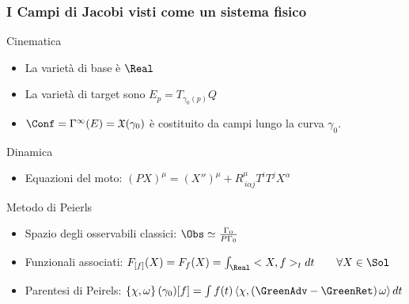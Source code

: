 \documentclass[8pt,handout]{beamer}
\begin{document}
	\begin{frame}
		\frametitle{I Campi di Jacobi visti come un sistema fisico}
			\begin{block}{Cinematica}
					\begin{itemize}
						\item La varietà di base è $\Real$ 
				\item La varietà di target  sono $E_p = T_{\gamma_0(p)}Q$
				\item $\Conf = \Gamma^\infty(E) = \mathfrak{X}(\gamma_0)$ è costituito da campi lungo la curva $\gamma_0$.
					\end{itemize}
			\end{block}
			\begin{block}{Dinamica}

				\begin{itemize}
					\item Equazioni del moto: $ \left( P X \right)^\mu = (X'')^\mu + R^\mu_{\, i \alpha j } T^i T^j X^\alpha$ 
				\end{itemize}

			\end{block}
	

			\begin{block}{Metodo di Peierls}
				\begin{itemize}
					\item Spazio degli osservabili classici:  $	\Obs \simeq \frac{\Gamma_0}{P \Gamma_0}$
					\item Funzionali associati: $ F_{[f]}(X) = F_f (X)= \int_\Real <X, f>_t dt \qquad \forall X \in \Sol $
					\item Parentesi di Peirels: 
						$ \left\lbrace\chi , \omega \right\rbrace (\gamma_0) [f] = 
							\int f(t) \left\langle\chi, \left(\GreenAdv - \GreenRet \right)\omega \right\rangle dt
						$
				\end{itemize}
			\end{block}
	\end{frame}
	
\end{document}
